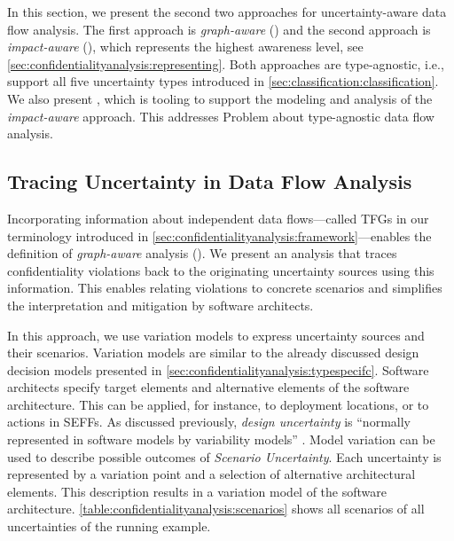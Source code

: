 In this section, we present the second two approaches for uncertainty-aware data flow analysis.
The first approach is \emph{graph-aware} () and the second approach is \emph{impact-aware} (), which represents the highest awareness level, see \autoref{sec:confidentialityanalysis:representing}.
Both approaches are type-agnostic, i.e., support all five uncertainty types introduced in \autoref{sec:classification:classification}.
We also present \abunai, which is tooling to support the modeling and analysis of the \emph{impact-aware} approach.
This addresses Problem  about type-agnostic data flow analysis.


\subsection{Tracing Uncertainty in Data Flow Analysis}%
\label{sec:confidentialityanalysis:tracing}

Incorporating information about independent data flows---called \acp{TFG} in our terminology introduced in \autoref{sec:confidentialityanalysis:framework}---enables the definition of \emph{graph-aware} analysis ().
We present an analysis that traces confidentiality violations back to the originating uncertainty sources using this information.
This enables relating violations to concrete scenarios and simplifies the interpretation and mitigation by software architects.

In this approach, we use variation models \cite{walter_architecture-based_2023,mehl_palladio_2022} to express uncertainty sources and their scenarios.
Variation models are similar to the already discussed design decision models presented in \autoref{sec:confidentialityanalysis:typespecifc}.
Software architects specify target elements and alternative elements of the software architecture.
This can be applied, for instance, to deployment locations, or to actions in \acfp{SEFF}.
As discussed previously, \emph{design uncertainty} is \enquote{normally represented in software models by variability models} \cite{troya_uncertainty_2021}.
Model variation can be used to describe possible outcomes of \emph{Scenario Uncertainty}.
Each uncertainty is represented by a variation point and a selection of alternative architectural elements.
This description results in a variation model \cite{mehl_palladio_2022} of the software architecture.
\autoref{table:confidentialityanalysis:scenarios} shows all scenarios of all uncertainties of the running example.

